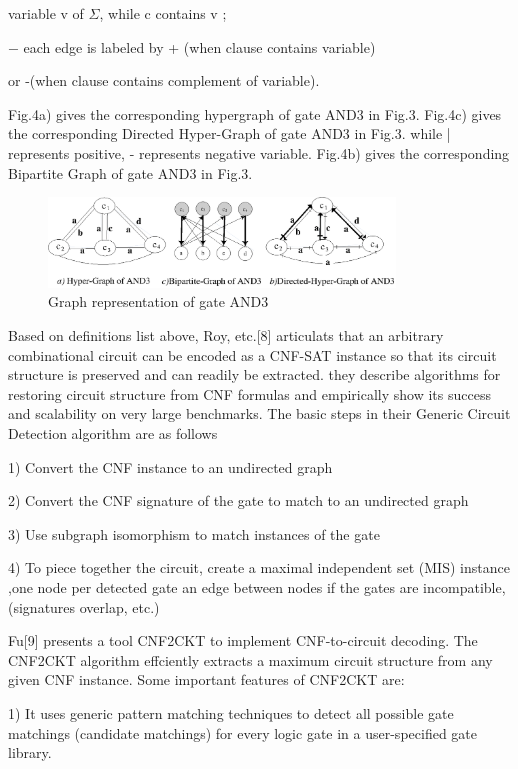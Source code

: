 \documentclass[runningheads,a4paper]{llncs}
\begin{document}
\setlength{\parindent}{5em}  variable v of $\Sigma$, while c contains v ;

\setlength{\parindent}{4em} $-$ each edge is labeled by + (when clause contains variable) 

\setlength{\parindent}{5em} or -(when clause contains complement of variable).

\setlength{\parindent}{2em} 

Fig.4a) gives the corresponding hypergraph of gate AND3 in Fig.3. 
Fig.4c) gives the corresponding Directed Hyper-Graph of gate AND3 in Fig.3. while | represents positive, - represents negative variable.
Fig.4b) gives the corresponding Bipartite Graph of gate AND3 in Fig.3.
\begin{figure}
\centering
\includegraphics[width=9.2cm]{a4}
\caption{Graph representation of gate AND3}
\end{figure}

Based on definitions list above, Roy, etc.[8] articulats that an arbitrary combinational circuit can be encoded as a CNF-SAT instance so that its circuit structure is preserved and can readily be extracted. they describe algorithms for restoring circuit structure from CNF formulas and empirically show its success and scalability on very large benchmarks. The basic steps in their Generic Circuit Detection algorithm are as follows 

1)	Convert the CNF instance to an undirected graph

2)	Convert the CNF signature of the gate to match to an undirected graph

3)	Use subgraph isomorphism to match instances of the gate

4)	To piece together the circuit, create a maximal independent set (MIS) instance ,one node per detected gate an edge between nodes if the gates are incompatible,(signatures overlap, etc.)

Fu[9] presents a tool CNF2CKT to implement CNF-to-circuit decoding. The CNF2CKT algorithm effciently extracts a maximum circuit structure from any given CNF instance. Some important features of CNF2CKT are:

1) It uses generic pattern matching techniques to detect all possible gate matchings (candidate matchings) for every logic gate in a user-specified gate library.
\end{document}
